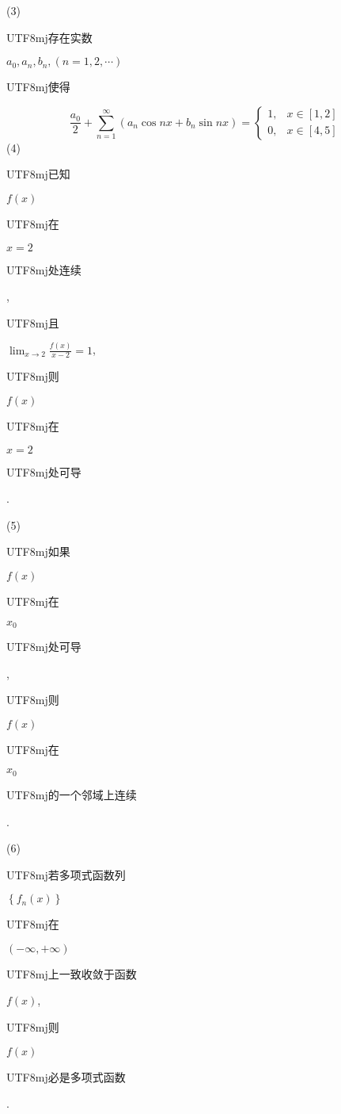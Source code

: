 \documentclass[10pt]{article}
\begin{document}
(3) \begin{CJK}{UTF8}{mj}存在实数\end{CJK} $a_{0}, a_{n}, b_{n},(n=1,2, \cdots)$ \begin{CJK}{UTF8}{mj}使得\end{CJK}
$$
\frac{a_{0}}{2}+\sum_{n=1}^{\infty}\left(a_{n} \cos n x+b_{n} \sin n x\right)= \begin{cases}1, & x \in[1,2] \\ 0, & x \in[4,5]\end{cases}
$$
(4) \begin{CJK}{UTF8}{mj}已知\end{CJK} $f(x)$ \begin{CJK}{UTF8}{mj}在\end{CJK} $x=2$ \begin{CJK}{UTF8}{mj}处连续\end{CJK}, \begin{CJK}{UTF8}{mj}且\end{CJK} $\lim _{x \rightarrow 2} \frac{f(x)}{x-2}=1$, \begin{CJK}{UTF8}{mj}则\end{CJK} $f(x)$ \begin{CJK}{UTF8}{mj}在\end{CJK} $x=2$ \begin{CJK}{UTF8}{mj}处可导\end{CJK}.

(5) \begin{CJK}{UTF8}{mj}如果\end{CJK} $f(x)$ \begin{CJK}{UTF8}{mj}在\end{CJK} $x_{0}$ \begin{CJK}{UTF8}{mj}处可导\end{CJK}, \begin{CJK}{UTF8}{mj}则\end{CJK} $f(x)$ \begin{CJK}{UTF8}{mj}在\end{CJK} $x_{0}$ \begin{CJK}{UTF8}{mj}的一个邻域上连续\end{CJK}.

(6) \begin{CJK}{UTF8}{mj}若多项式函数列\end{CJK} $\left\{f_{n}(x)\right\}$ \begin{CJK}{UTF8}{mj}在\end{CJK} $(-\infty,+\infty)$ \begin{CJK}{UTF8}{mj}上一致收敛于函数\end{CJK} $f(x)$, \begin{CJK}{UTF8}{mj}则\end{CJK} $f(x)$ \begin{CJK}{UTF8}{mj}必是多项式函数\end{CJK}.
\end{document}
